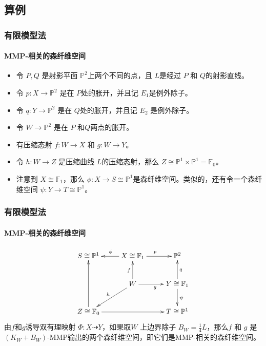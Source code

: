\documentclass[10pt]{ctexbeamer}
\begin{document}
\subsection{算例}
\begin{frame}[shrink]
  \frametitle{有限模型法}
  \framesubtitle{MMP-相关的森纤维空间}
  \begin{itemize}
    \item 
令  $P,Q$ 是射影平面 $\mathbb{P}^{2}$上两个不同的点，且 $L$是经过 $P$ 和 $Q$的射影直线。
    \item 令 $p:X\to \mathbb{P}^{2}$ 是在 $P$处的胀开，并且记 $E_{1}$是例外除子。
    \item 令 $q:Y\to \mathbb{P}^{2}$ 是在 $Q$处的胀开，并且记 $E_{2}$ 是例外除子。 
    \item 令 $W\to \mathbb{P}^{2}$ 是在  $P$ 和$Q$两点的胀开。
  \pause
    \item 有压缩态射 $f:W\to X$ 和 $g:W\to Y$。 
    \item 令  $h:W\to Z$ 是压缩曲线 $L$的压缩态射，那么 $Z\cong \mathbb{P}^{1} \times \mathbb{P}^{1}=\mathbb{F}_{0}$。 
  \pause
    \item 注意到 $X\cong \mathbb{F}_{1}$，那么 $\phi:X\to S \cong \mathbb{P}^{1}$是森纤维空间。类似的，还有令一个森纤维空间 $\psi: Y\to T\cong \mathbb{P}^{1}$。 
  \end{itemize}
\end{frame}

\begin{frame}[shrink]
  \frametitle{有限模型法}
  \framesubtitle{MMP-相关的森纤维空间}
\[ \xymatrix{
    S\cong \mathbb{P}^{1}&X\cong \mathbb{F}_{1}\ar[l]_{\phi}\ar[r]^{p} & \mathbb{P}^{2} \\
    &W\ar[u]^{f}\ar[r]_{g}\ar[ld]_{h} & Y\cong \mathbb{F}_{1}\ar[u]_{q}\ar[d]^{\psi}\\
    Z\cong \mathbb{F}_{0}\ar[uu]\ar[rr]&&T\cong \mathbb{P}^{1} } \]
  \pause
由$f$和$g$诱导双有理映射 $\Phi: X\dashrightarrow  Y$，如果取$W$ 上边界除子 $B_{W}=\frac{1}{4}L$，那么$f$ 和 $g$ 是 $(K_{W}+B_{W})$-MMP输出的两个森纤维空间，即它们是MMP-相关的森纤维空间。
\end{frame}
\end{document}
